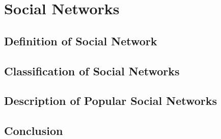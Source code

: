 

\chapter{Social Networks}

\ifpdf
    \graphicspath{{3_social_networks/figures/PNG/}{3_social_networks/figures/PDF/}{3_social_networks/figures/}}
\else
    \graphicspath{{3_social_networks/figures/EPS/}{3_social_networks/figures/}}
\fi


\section{Definition of Social Network}

\section{Classification of Social Networks}

\section{Description of Popular Social Networks}

\section{Conclusion}